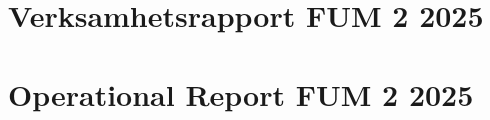 \documentclass{article}
\begin{document}
\section*{Verksamhetsrapport FUM 2 2025}
\newpage
\setSectionLangToEng
\section*{Operational Report FUM 2 2025}
\end{document}

